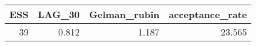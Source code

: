 \begin{longtable}{rrrr}
\toprule
ESS & LAG\_30 & Gelman\_rubin & acceptance\_rate \\ 
\midrule
39 & 0.812 & 1.187 & 23.565 \\ 
\bottomrule
\end{longtable}

